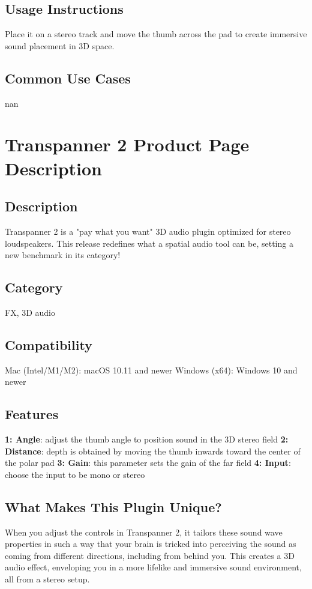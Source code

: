 \documentclass[8pt]{article}
\begin{document}
\subsection*{Usage Instructions}
Place it on a stereo track and move the thumb across the pad to create immersive sound placement in 3D space. 

\subsection*{Common Use Cases}
nan
\section*{Transpanner 2 Product Page Description}

\subsection*{Description}
Transpanner 2 is a "pay what you want" 3D audio plugin optimized for stereo loudspeakers. This release redefines what a spatial audio tool can be, setting a new benchmark in its category!

\subsection*{Category}
FX, 3D audio

\subsection*{Compatibility}
Mac (Intel/M1/M2): macOS 10.11 and newer
Windows (x64): Windows 10 and newer

\subsection*{Features}
\textbf{1: Angle}: adjust the thumb angle to position sound in the 3D stereo field
\textbf{2: Distance}: depth is obtained by moving the thumb inwards toward the center of the polar pad
\textbf{3: Gain}: this parameter sets the gain of the far field
\textbf{4: Input}: choose the input to be mono or stereo

\subsection*{What Makes This Plugin Unique?}
When you adjust the controls in Transpanner 2, it tailors these sound wave properties in such a way that your brain is tricked into perceiving the sound as coming from different directions, including from behind you. This creates a 3D audio effect, enveloping you in a more lifelike and immersive sound environment, all from a stereo setup.
\end{document}
